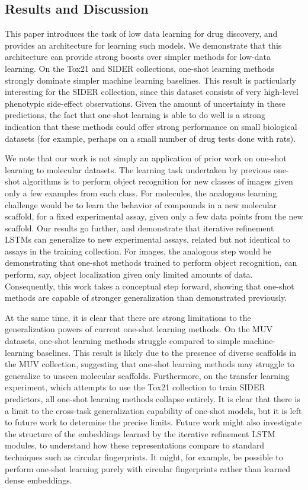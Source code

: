 \subsection{Results and Discussion}

This paper introduces the task of low data learning for drug discovery, and provides an architecture for learning such models. We demonstrate that this architecture can provide strong boosts over simpler methods for low-data learning. On the Tox21 and SIDER collections, one-shot learning methods strongly dominate simpler machine learning baselines. This result is particularly interesting for the SIDER collection, since this dataset consists of very high-level phenotypic side-effect observations. Given the amount of uncertainty in these predictions, the fact that one-shot learning is able to do well is a strong indication that these methods could offer strong performance on small biological datasets (for example, perhaps on a small number of drug tests done with rats).

We note that our work is not simply an application of prior work on one-shot learning to molecular datasets. The learning task undertaken by previous one-shot algorithms \cite{vinyals2016matching} is to perform object recognition for new classes of images given only a few examples from each class. For molecules, the analogous learning challenge would be to learn the behavior of compounds in a new molecular scaffold, for a fixed experimental assay, given only a few data points from the new scaffold. Our results go further, and demonstrate that iterative refinement LSTMs can generalize to new experimental assays, related but not identical to assays in the training collection. For images, the analogous step would be demonstrating that one-shot methods trained to perform object recognition, can perform, say, object localization given only limited amounts of data. Consequently, this work takes a conceptual step forward, showing that one-shot methods are capable of stronger generalization than demonstrated previously.

At the same time, it is clear that there are strong limitations to the generalization powers of current one-shot learning methods. On the MUV datasets, one-shot learning methods struggle compared to simple machine-learning baselines. This result is likely due to the presence of diverse scaffolds in the MUV collection, suggesting that one-shot learning methods may struggle to generalize to unseen molecular scaffolds. Furthermore, on the transfer learning experiment, which attempts to use the Tox21 collection to train SIDER predictors, all one-shot learning methods collapse entirely. It is clear that there is a limit to the cross-task generalization capability of one-shot models, but it is left to future work to determine the precise limits. Future work might also investigate the structure of the embeddings learned by the iterative refinement LSTM modules, to understand how these representations compare to standard techniques such as circular fingerprints. It might, for example, be possible to perform one-shot learning purely with circular fingerprints rather than learned dense embeddings.

